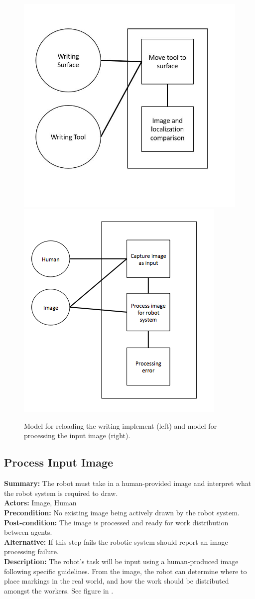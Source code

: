 \begin{figure}
 \centering
  \includegraphics[width=0.48\columnwidth]{figs/use_case-use_writing_implement.jpg}
  \includegraphics[width=0.48\columnwidth]{figs/use_case-process_input_image.jpg}
 \label{fig:reload_implement_and_image}
 \caption{Model for reloading the writing implement (left) and model for processing the input image (right).}
\end{figure}

\subsection{Process Input Image}
\textbf{Summary:} The robot must take in a human-provided image and interpret what the robot system is required to draw. \\
\textbf{Actors:} Image, Human \\
\textbf{Precondition:}  No existing image being actively drawn by the robot system. \\
\textbf{Post-condition:} The image is processed and ready for work distribution between agents. \\
\textbf{Alternative:} If this step fails the robotic system should report an image processing failure. \\
\textbf{Description:} The robot's task will be input using a human-produced image following specific guidelines. From the image, the robot can determine where to place markings in the real world, and how the work should be distributed amongst the workers. See figure in .\\



